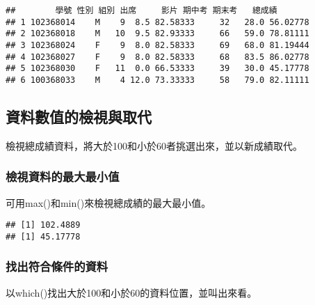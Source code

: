 \documentclass[
]{book}
\newenvironment{Shaded}{\begin{snugshade}}{\end{snugshade}}
\newcommand{\FunctionTok}[1]{\textcolor[rgb]{0.00,0.00,0.00}{#1}}
\newcommand{\NormalTok}[1]{#1}
\newcommand{\SpecialCharTok}[1]{\textcolor[rgb]{0.00,0.00,0.00}{#1}}
\begin{document}
\begin{verbatim}
##        學號 性別 組別 出席     影片 期中考 期末考   總成績
## 1 102368014    M    9  8.5 82.58333     32   28.0 56.02778
## 2 102368018    M   10  9.5 82.93333     66   59.0 78.81111
## 3 102368024    F    9  8.0 82.58333     69   68.0 81.19444
## 4 102368027    F    9  8.0 82.58333     68   83.5 86.02778
## 5 102368030    F   11  0.0 66.53333     39   30.0 45.17778
## 6 100368033    M    4 12.0 73.33333     58   79.0 82.11111
\end{verbatim}

\hypertarget{ux8cc7ux6599ux6578ux503cux7684ux6aa2ux8996ux8207ux53d6ux4ee3}{%
\subsection{資料數值的檢視與取代}\label{ux8cc7ux6599ux6578ux503cux7684ux6aa2ux8996ux8207ux53d6ux4ee3}}

檢視總成績資料，將大於100和小於60者挑選出來，並以新成績取代。

\hypertarget{ux6aa2ux8996ux8cc7ux6599ux7684ux6700ux5927ux6700ux5c0fux503c}{%
\subsubsection{檢視資料的最大最小值}\label{ux6aa2ux8996ux8cc7ux6599ux7684ux6700ux5927ux6700ux5c0fux503c}}

可用max()和min()來檢視總成績的最大最小值。

\begin{Shaded}
\end{Shaded}

\begin{verbatim}
## [1] 102.4889
## [1] 45.17778
\end{verbatim}

\hypertarget{ux627eux51faux7b26ux5408ux689dux4ef6ux7684ux8cc7ux6599}{%
\subsubsection{找出符合條件的資料}\label{ux627eux51faux7b26ux5408ux689dux4ef6ux7684ux8cc7ux6599}}

以which()找出大於100和小於60的資料位置，並叫出來看。
\end{document}
